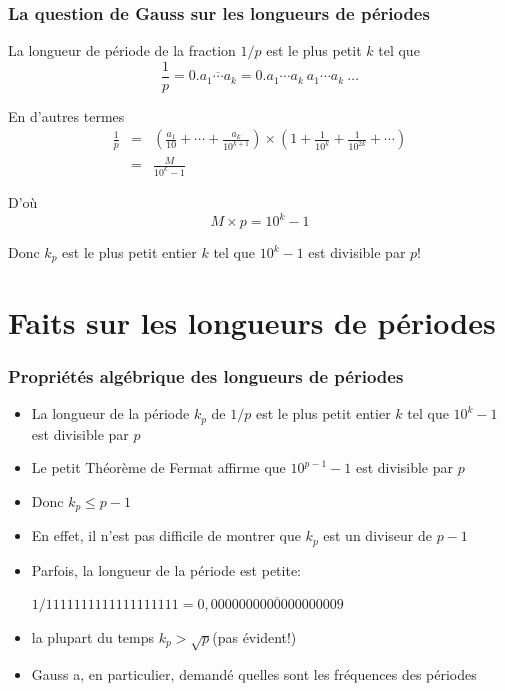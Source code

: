 \documentclass[10pt,handout]{beamer} %
\theoremstyle{definition}
\begin{document}
\begin{frame}\frametitle{La question de Gauss sur les longueurs de p\'eriodes} \pause

La longueur de p\'eriode de la fraction $1/p$ est le plus petit $k$ tel que
$$\frac1p=0.\overline{a_1\cdots a_k}=0.a_1\cdots a_k\ a_1\cdots a_k\ \ldots$$\pause

En d'autres termes
\begin{eqnarray*}
\frac1p&=&\left(\frac{a_1}{10}+\cdots+\frac{a_k}{10^{k+1}}\right)\times\left(1+\frac1{10^k}+\frac1{10^{2k}}+\cdots\right)\\
 &=&\frac{M}{10^k-1}
\end{eqnarray*}\pause

D'o\`u $$M\times p=10^k-1$$\pause

{\alert{Donc $k_p$ est le plus petit entier $k$ tel que $10^k-1$ est divisible par $p$!}}
\end{frame}

	\section{Faits sur les longueurs de \texorpdfstring{p\'eriodes}{periode}}

\begin{frame}
 \frametitle{Propri\'et\'es alg\'ebrique des longueurs de p\'eriodes}
 
\begin{itemize}[<+-|alert@+>]
 \item La longueur de la p\'eriode $k_p$ de $1/p$ est le plus petit entier $k$ tel que $10^k-1$ est divisible par $p$

 \item Le petit Th\'eor\`eme de Fermat affirme que $10^{p-1}-1$ est divisible par $p$

 \item Donc $k_p\le p-1$ 

 \item En effet, il n'est pas difficile de montrer que $k_p$ est un diviseur de $p-1$

 \item Parfois, la longueur de la p\'eriode est petite:
 
\centerline{\scriptsize{ $1/1111111111111111111=0,\overline{0000000000000000009}$}}

\item la plupart du temps $k_p>\sqrt{p}$\qquad (pas \'evident!)

\item Gauss a, en particulier, demand\'e quelles sont les fr\'equences des p\'eriodes
\end{itemize}
\end{frame}
\end{document}
